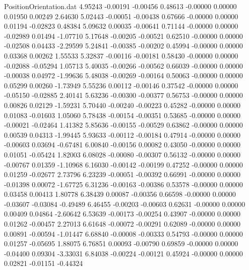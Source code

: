 \begin{filecontents}{PositionOrientation.dat}
   4.95243   -0.00191   -0.00456     0.48613   -0.00000    0.00000    0.01950    0.00249    2.64630
   5.02443   -0.00051   -0.00438     0.67666   -0.00000    0.00000    0.01194   -0.02823    0.48384
   5.09632    0.00035   -0.00641     0.71144   -0.00000    0.00000   -0.02989    0.01494   -1.07710
   5.17648   -0.00205   -0.00521     0.62510   -0.00000    0.00000   -0.02508    0.04433   -2.29599
   5.24841   -0.00385   -0.00202     0.45994   -0.00000    0.00000    0.03368    0.00262    1.55533
   5.32837   -0.00116   -0.00181     0.58430   -0.00000    0.00000   -0.02088   -0.05294    1.05713
   5.40035   -0.00266   -0.00562     0.66039   -0.00000    0.00000   -0.00038    0.04972   -1.99636
   5.48038   -0.00269   -0.00164     0.50063   -0.00000    0.00000    0.05299    0.00260   -1.73949
   5.55236    0.00112   -0.00146     0.37542   -0.00000    0.00000   -0.05150   -0.02885    2.40141
   5.63236   -0.00300   -0.00377     0.56753   -0.00000    0.00000    0.00826    0.02129   -1.59231
   5.70440   -0.00240   -0.00223     0.45282   -0.00000    0.00000    0.01083   -0.01603    1.05060
   5.78438   -0.00154   -0.00351     0.53685   -0.00000    0.00000   -0.00021   -0.02464    1.41382
   5.85636   -0.00155   -0.00529     0.63862   -0.00000    0.00000    0.00539    0.04313   -1.99445
   5.93633   -0.00112   -0.00184     0.47914   -0.00000    0.00000   -0.00603    0.03694   -0.67481
   6.00840   -0.00156    0.00082     0.43050   -0.00000    0.00000    0.01051   -0.05424    1.82003
   6.08028   -0.00080   -0.00307     0.56132   -0.00000    0.00000   -0.00767    0.01359   -1.10968
   6.16030   -0.00142   -0.00199     0.47252   -0.00000    0.00000    0.01259   -0.02677    2.73796
   6.23239   -0.00051   -0.00392     0.66991   -0.00000    0.00000   -0.01398    0.00072   -1.67725
   6.31236   -0.00163   -0.00386     0.53578   -0.00000    0.00000    0.03458    0.00413    1.80778
   6.38439    0.00087   -0.00356     0.66598   -0.00000    0.00000   -0.03607   -0.03084   -0.49489
   6.46455   -0.00203   -0.00603     0.62631   -0.00000    0.00000    0.00409    0.04864   -2.60642
   6.53639   -0.00173   -0.00254     0.43907   -0.00000    0.00000    0.01262   -0.00457    2.27013
   6.61648   -0.00072   -0.00291     0.62089   -0.00000    0.00000    0.00891   -0.00594   -1.01447
   6.68840   -0.00008   -0.00333     0.54793   -0.00000    0.00000    0.01257   -0.05695    1.88075
   6.76851    0.00093   -0.00790     0.69859   -0.00000    0.00000   -0.04400    0.09304   -3.33031
   6.84038   -0.00224   -0.00121     0.45924   -0.00000    0.00000    0.02821   -0.01151   -0.44324

\end{filecontents}
